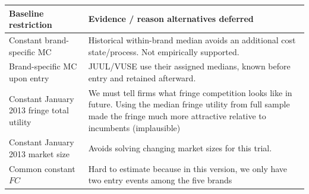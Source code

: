 \documentclass[11pt,]{article}
\begin{document}
\begin{longtable}[]{@{}ll@{}}
\toprule
\begin{minipage}[b]{0.32\columnwidth}\raggedright\strut
Baseline restriction\strut
\end{minipage} & \begin{minipage}[b]{0.62\columnwidth}\raggedright\strut
Evidence / reason alternatives deferred\strut
\end{minipage}\tabularnewline
\midrule
\endhead
\begin{minipage}[t]{0.32\columnwidth}\raggedright\strut
Constant brand-specific MC\strut
\end{minipage} & \begin{minipage}[t]{0.62\columnwidth}\raggedright\strut
Historical within-brand median avoids an additional cost state/process.
Not empirically supported.\strut
\end{minipage}\tabularnewline
\begin{minipage}[t]{0.32\columnwidth}\raggedright\strut
Brand-specific MC upon entry\strut
\end{minipage} & \begin{minipage}[t]{0.62\columnwidth}\raggedright\strut
JUUL/VUSE use their assigned medians, known before entry and retained
afterward.\strut
\end{minipage}\tabularnewline
\begin{minipage}[t]{0.32\columnwidth}\raggedright\strut
Constant January 2013 fringe total utility\strut
\end{minipage} & \begin{minipage}[t]{0.62\columnwidth}\raggedright\strut
We must tell firms what fringe competition looks like in future. Using
the median fringe utility from full sample made the fringe much more
attractive relative to incumbents (implausible)\strut
\end{minipage}\tabularnewline
\begin{minipage}[t]{0.32\columnwidth}\raggedright\strut
Constant January 2013 market size\strut
\end{minipage} & \begin{minipage}[t]{0.62\columnwidth}\raggedright\strut
Avoids solving changing market sizes for this trial.\strut
\end{minipage}\tabularnewline
\begin{minipage}[t]{0.32\columnwidth}\raggedright\strut
Common constant \(FC\)\strut
\end{minipage} & \begin{minipage}[t]{0.62\columnwidth}\raggedright\strut
Hard to estimate because in this version, we only have two entry events
among the five brands\strut
\end{minipage}\tabularnewline
\bottomrule
\end{longtable}
\end{document}
